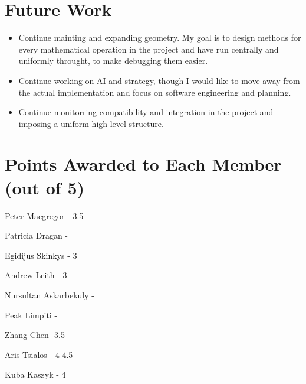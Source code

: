 \documentclass[dvips]{article}
\begin{document}
\section{Future Work}
\begin{itemize}
  \item Continue mainting and expanding geometry. My goal is to design methods for every mathematical operation in the project and have run 		centrally and uniformly throught, to make debugging them easier.
  \item Continue working on AI and strategy, though I would like to move away from the actual implementation and focus on software engineering and 		planning.
  \item Continue monitorring compatibility and integration in the project and imposing a uniform high level structure.
\end{itemize}
\section{Points Awarded to Each Member (out of 5)}
\begin{itemize}
\begin{multicols}{2}
\item Peter Macgregor - 3.5
\item Patricia Dragan - 
\item Egidijus Skinkys - 3
\item Andrew Leith - 3
\item Nursultan Askarbekuly - 
\item Peak Limpiti - 
\item Zhang Chen  -3.5
\item Aris Tsialos - 4-4.5
\item Kuba Kaszyk - 4
\end{multicols}
\end{itemize}
\end{document}
